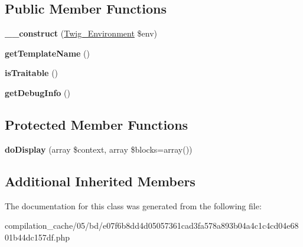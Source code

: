 \subsection*{Public Member Functions}
\begin{DoxyCompactItemize}
\item 
\hypertarget{class_____twig_template__05bde07f6b8dd4d05057361cad3fa578a893b04a4c1c4cd04e6801b44dc157df_a4f8326243132c1450a81e0a817aa1be7}{}{\bfseries \+\_\+\+\_\+construct} (\hyperlink{class_twig___environment}{Twig\+\_\+\+Environment} \$env)\label{class_____twig_template__05bde07f6b8dd4d05057361cad3fa578a893b04a4c1c4cd04e6801b44dc157df_a4f8326243132c1450a81e0a817aa1be7}

\item 
\hypertarget{class_____twig_template__05bde07f6b8dd4d05057361cad3fa578a893b04a4c1c4cd04e6801b44dc157df_a621a3ccd148ed8b9e937da6959c98f39}{}{\bfseries get\+Template\+Name} ()\label{class_____twig_template__05bde07f6b8dd4d05057361cad3fa578a893b04a4c1c4cd04e6801b44dc157df_a621a3ccd148ed8b9e937da6959c98f39}

\item 
\hypertarget{class_____twig_template__05bde07f6b8dd4d05057361cad3fa578a893b04a4c1c4cd04e6801b44dc157df_aa9eb89be270f6afc256ef5e272b78a63}{}{\bfseries is\+Traitable} ()\label{class_____twig_template__05bde07f6b8dd4d05057361cad3fa578a893b04a4c1c4cd04e6801b44dc157df_aa9eb89be270f6afc256ef5e272b78a63}

\item 
\hypertarget{class_____twig_template__05bde07f6b8dd4d05057361cad3fa578a893b04a4c1c4cd04e6801b44dc157df_abd0ecb0136f4228db2bd963bfc1e20d7}{}{\bfseries get\+Debug\+Info} ()\label{class_____twig_template__05bde07f6b8dd4d05057361cad3fa578a893b04a4c1c4cd04e6801b44dc157df_abd0ecb0136f4228db2bd963bfc1e20d7}

\end{DoxyCompactItemize}
\subsection*{Protected Member Functions}
\begin{DoxyCompactItemize}
\item 
\hypertarget{class_____twig_template__05bde07f6b8dd4d05057361cad3fa578a893b04a4c1c4cd04e6801b44dc157df_adb62b7c226e07d30f836ed16158d924f}{}{\bfseries do\+Display} (array \$context, array \$blocks=array())\label{class_____twig_template__05bde07f6b8dd4d05057361cad3fa578a893b04a4c1c4cd04e6801b44dc157df_adb62b7c226e07d30f836ed16158d924f}

\end{DoxyCompactItemize}
\subsection*{Additional Inherited Members}


The documentation for this class was generated from the following file\+:\begin{DoxyCompactItemize}
\item 
compilation\+\_\+cache/05/bd/e07f6b8dd4d05057361cad3fa578a893b04a4c1c4cd04e6801b44dc157df.\+php\end{DoxyCompactItemize}
